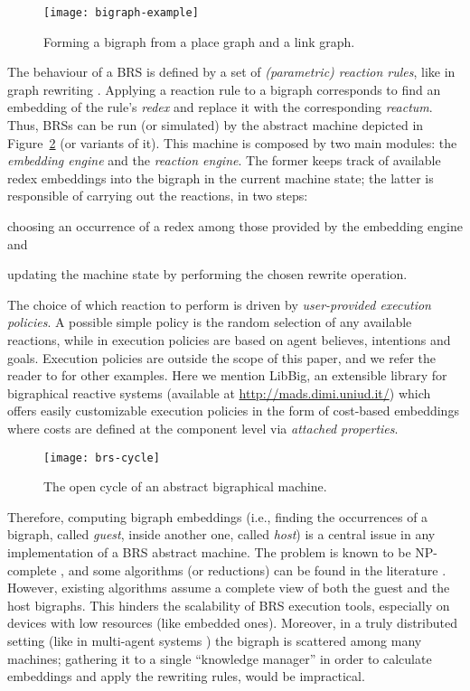 \documentclass[a4paper,english,10pt]{article}
\theoremstyle{plain}\newtheorem{theorem}{Theorem}
\theoremstyle{plain}\newtheorem{corollary}[theorem]{Corollary}
\theoremstyle{plain}\newtheorem{proposition}[theorem]{Proposition}
\theoremstyle{plain}\newtheorem{lemma}[theorem]{Lemma}
\theoremstyle{plain}\newtheorem{definition}{Definition}
\theoremstyle{plain}\newtheorem{remark}{Remark}
\theoremstyle{plain}\newtheorem{example}[remark]{Example}
\newcommand{\?}[1]{}
\begin{document}
\begin{figure}[t]
	\centering 
	\texttt{[image: bigraph-example]}
	\caption{Forming a bigraph from a place graph and a link graph.}
	\label{fig:bigraph-comp}
\end{figure}

The behaviour of a BRS is defined by
a set of \emph{(parametric) reaction rules}, like in graph rewriting
\cite{graphtransformation}.  Applying a reaction rule to a bigraph
corresponds to find an embedding of the rule's \emph{redex} and
replace it with the corresponding \emph{reactum}. Thus, BRSs can be
run (or simulated) by the abstract machine depicted in
Figure~\ref{fig:brs-cycle} (or variants of it).  This machine is
composed by two main modules: the \emph{embedding engine} and the
\emph{reaction engine}.  The former keeps track of available redex
embeddings into the bigraph in the current machine state; the latter
is responsible of carrying out the reactions, in two steps:
\begin{enumerate*}[label=\em(\alph*)]
	\item 
		choosing an occurrence of a redex among those 
		provided by the embedding engine and
	\item 
		updating the machine state by performing the 
		chosen rewrite operation.
\end{enumerate*}

The choice of which reaction to perform is driven by
\emph{user-provided execution policies}.  A possible simple policy is
the random selection of any available reactions, while in
\cite{mmp:dais14} execution policies are based on agent believes,
intentions and goals.  Execution policies are outside the scope of
this paper, and we refer the reader to \cite{perrone:thesis} for other
examples. Here we mention LibBig, an extensible library for
bigraphical reactive systems (available at \url{http://mads.dimi.uniud.it/})
which offers easily customizable execution policies in the form of
cost-based embeddings where costs are defined at the component level
via \emph{attached properties}.

\begin{figure}[t]
	\centering 
	\texttt{[image: brs-cycle]}
	\caption{The open cycle of an abstract bigraphical machine.}
	\label{fig:brs-cycle}
\end{figure}

Therefore, computing bigraph embeddings (i.e., finding the occurrences
of a bigraph, called \emph{guest}, inside another one, called
\emph{host}) is a central issue in any implementation of a BRS
abstract machine.  The problem is known to be NP-complete
\cite{bmr:tgc14}, and some algorithms (or reductions) can be found in
the literature \cite{gdbh:implmatch,mp:memo14,sevegnani2010sat}.
However, existing algorithms assume a complete view of both the guest
and the host bigraphs.  This hinders the scalability of BRS execution
tools, especially on devices with low resources (like embedded
ones). Moreover, in a truly distributed setting (like in multi-agent
systems \cite{mmp:dais14}) the bigraph is scattered among many
machines; gathering it to a single ``knowledge manager'' in order to
calculate embeddings and apply the rewriting rules, would be
impractical.
\end{document}
